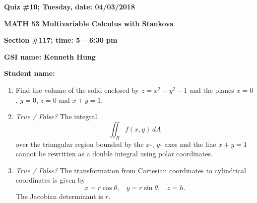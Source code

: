 \documentclass{article}
\begin{document}
{\bf Quiz \#10; Tuesday, date: 04/03/2018}

{\bf MATH 53 Multivariable Calculus with Stankova}

{\bf Section \#117; time: 5 -- 6:30 pm}

{\bf GSI name: Kenneth Hung}

{\bf Student name:}

\vspace*{0.25in}

\begin{enumerate}
\item Find the volume of the solid enclosed by $z = x^2 + y^2 - 1$ and the planes $x = 0$, $y = 0$, $z = 0$ and $x + y = 1$.

\item {\em True / False?} The integral
\[
\iint_R f(x, y) \,dA
\]
over the triangular region bounded by the $x$-, $y$- axes and the line $x + y = 1$ cannot be rewritten as a double integral using polar coordinates.

\item {\em True / False?} The transformation from Cartesian coordinates to cylindrical coordinates is given by
\[
x = r \cos \theta, ~~~~ y = r \sin \theta, ~~~~ z = h.
\]
The Jacobian determinant is $r$.
\end{enumerate}
\end{document}
